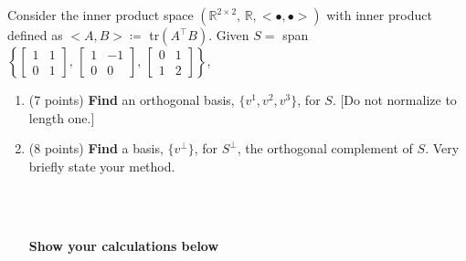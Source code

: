 \documentclass[letterpaper]{article}
\newcommand{\real}{\mathbb R}  %
\begin{document}
 Consider the inner product space $(\real^{2\times 2},\,\real,<\bullet, \bullet>)$ with inner product defined as $<A, B> \coloneqq $ tr$(A^\top B)$.
Given $S = $ span$\left\{\begin{bmatrix}1 & 1 \\ 0 &1 \end{bmatrix},\,\begin{bmatrix}1 & -1 \\0 & 0 \end{bmatrix},\,\begin{bmatrix}0 & 1 \\1 & 2 \end{bmatrix} \right\}$,

\begin{enumerate}
\setlength{\itemsep}{.15in}
\renewcommand{\labelenumi}{(\alph{enumi})}
\setlength{\itemsep}{.1in}
\item (7 points) \textbf{Find} an orthogonal basis, $\{v^1, v^2, v^3\}$, for $S$. [Do not normalize to length one.]


\item  (8 points) \textbf{Find} a basis, $\{v^\perp\}$, for $S^\perp$, the orthogonal complement of $S$. Very briefly state your method.
    \vspace*{.3in}

\\

\vspace*{.3in}
\\
 \vspace*{.3in}


 \noindent \textbf{Show your calculations below}
\end{enumerate}
\end{document}
